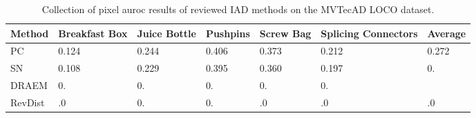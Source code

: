 \begin{table}[htbp]
    \tiny
    \centering
    \begin{tabularx}{\textwidth}{|X|X|X|X|X|X|X|}%
        \hline
        \textbf{Method} & \textbf{Breakfast Box} & \textbf{Juice Bottle} & \textbf{Pushpins} & \textbf{Screw Bag} & \textbf{Splicing Connectors} & \textbf{Average} \\
        \hline
        PC \cite{patchCore2022} & 0.124 & 0.244 & 0.406 & 0.373 & 0.212 & 0.272 \\
        \hline 
        SN \cite{liu2023simplenet} & 0.108 & 0.229 & 0.395 & 0.360 & 0.197 & 0. \\
        \hline
        DRAEM \cite{Zavrtanik_2021DRAEM} & 0. & 0. & 0. & 0. & 0. &  \\
        \hline
        RevDist \cite{revdist2023} & .0 & 0. & 0. & .0 & .0 & .0 \\
        \hline
    \end{tabularx}
    \caption{Collection of pixel auroc results of reviewed IAD methods on the MVTecAD LOCO \cite{LOCODentsAndScratchesBergmann2022} dataset.}
    \label{tab:sproloco}
\end{table}


